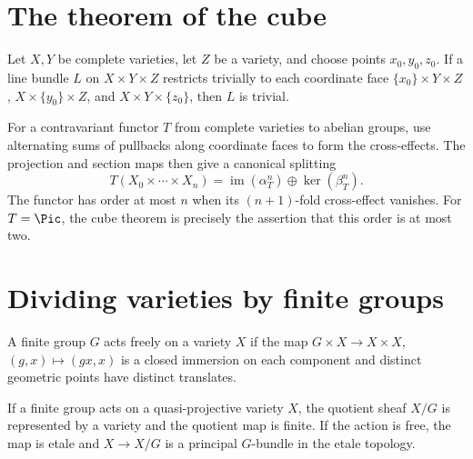 \section{The theorem of the cube}
\label{mumford-II6}

\begin{theorem}
\label{mumford-thm-cube-varieties}
Let $X,Y$ be complete varieties, let $Z$ be a variety, and choose points
$x_0,y_0,z_0$.  If a line bundle $L$ on $X\times Y\times Z$ restricts
trivially to each coordinate face
$\{x_0\}\times Y\times Z$, $X\times\{y_0\}\times Z$, and
$X\times Y\times\{z_0\}$, then $L$ is trivial.
\notready
\end{theorem}

\begin{proposition}
\label{mumford-prop-picard-quadratic}
For a contravariant functor $T$ from complete varieties to abelian groups, use
alternating sums of pullbacks along coordinate faces to form the cross-effects.
The projection and section maps then give a canonical splitting
\[
 T(X_0\times\cdots\times X_n)=\operatorname{im}(\alpha_T^n)\oplus
 \ker(\beta_T^n).
\]
The functor has order at most $n$ when its $(n+1)$-fold cross-effect vanishes.
For $T=\Pic$, the cube theorem is precisely the assertion that this order is
at most two.
\notready
\end{proposition}

\section{Dividing varieties by finite groups}
\label{mumford-II7}

\begin{definition}
\label{mumford-def-free-finite-action}
A finite group $G$ acts freely on a variety $X$ if the map
$G\times X\to X\times X$, $(g,x)\mapsto(gx,x)$ is a closed immersion on
each component and distinct geometric points have distinct translates.
\notready
\end{definition}

\begin{theorem}
\label{mumford-thm-finite-group-quotient}
If a finite group acts on a quasi-projective variety $X$, the quotient sheaf
$X/G$ is represented by a variety and the quotient map is finite.  If the
action is free, the map is etale and $X\to X/G$ is a principal $G$-bundle in
the etale topology.
\notready
\end{theorem}

